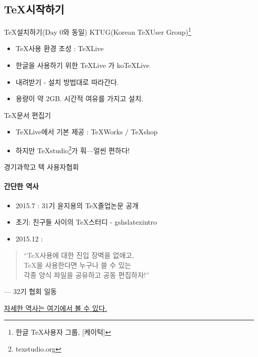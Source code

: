 \documentclass[12pt]{beamer}
\begin{document}
\subsection{\TeX 시작하기}
\begin{frame}{\TeX 설치하기{\normalsize (Day 0와 동일)}}
	KTUG(Korean \TeX User Group)\footnote{한글 \TeX 사용자 그룹, [케이턱]}
	\begin{itemize}
		\item \TeX 사용 환경 조성 : TeXLive
		\item 한글을 사용하기 위한 TeXLive 가 koTeXLive
		\item 내려받기 - 설치 방법대로 따라간다.
		\item 용량이 약 2GB. 시간적 여유를 가지고 설치.
	\end{itemize}
	\TeX 문서 편집기
	\begin{itemize}
		\item TeXLive에서 기본 제공 : TeXWorks / TeXshop
		\item 하지만 TeXstudio\footnote{texstudio.org}가 훠---얼씬 
		편하다!
	\end{itemize}
\end{frame}
\begin{frame}{경기과학고 텍 사용자협회}
	\framesubtitle{간단한 역사}
	\begin{itemize}
		\item 2015.7 : 31기 윤지용의 \TeX 졸업논문 공개
		\item 초기: 친구들 사이의 \TeX 스터디 - gshslatexintro
		\item 2015.12 :
	\end{itemize}
	\begin{quote}
		``\TeX 사용에 대한 진입 장벽을 없애고, \\
		\TeX 을 사용한다면 누구나 쓸 수 있는 \\
		각종 양식 파일을 공유하고 공동 편집하자!''
	\end{quote}
	\vspace{-.5cm}
	\begin{flushright}
		--- 32기 협회 일동
	\end{flushright}
	
	\href{https://github.com/gshslatexintro/gshslatexintro/wiki/History-of-GSHS-TeX-Society}{자세한 역사는 여기에서 볼 수 있다.}
\end{frame}
\end{document}

